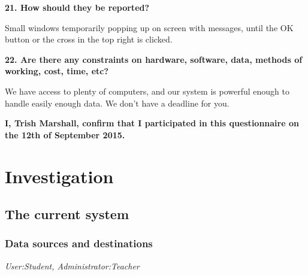 \textbf{21. How should they be reported?}

Small windows temporarily popping up on screen with messages, until the OK button or the cross in the top right is clicked.

\textbf{22. Are there any constraints on hardware, software, data, methods of working, cost, time, etc?}

We have access to plenty of computers, and our system is powerful enough to handle easily enough data. We don't have a deadline for you. 

\textbf{I, Trish Marshall, confirm that I participated in this questionnaire on the 12th of September 2015.}

\section{Investigation}

\subsection{The current system}

\subsubsection{Data sources and destinations}

\textit{User:Student, Administrator:Teacher}

